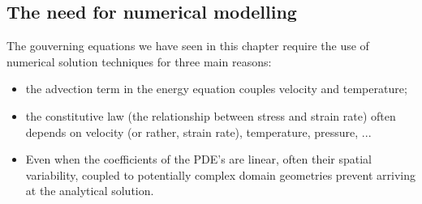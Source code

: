 

\newpage
\subsection{The need for numerical modelling}

The gouverning equations we have seen in this chapter require the use 
of numerical solution techniques for three main reasons:
\begin{itemize}
\item the advection term in the energy equation couples velocity and temperature;
\item the constitutive law (the relationship between stress and strain rate) 
often depends on velocity (or rather, strain rate), temperature, pressure, ...
\item Even when the coefficients of the PDE's are linear, often their spatial
variability, coupled to potentially complex domain geometries prevent 
arriving at the analytical solution.
\end{itemize}




